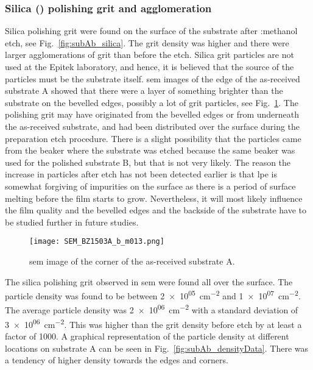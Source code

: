 \subsubsection{Silica () polishing grit and agglomeration}

Silica polishing grit were found on the surface of the substrate after :methanol etch, see Fig.~\ref{fig:subAb_silica}. The grit density was higher and there were larger agglomerations of grit than before the etch. Silica grit particles are not used at the Epitek laboratory, and hence, it is believed that the source of the particles must be the substrate itself. \Ac{sem} images of the edge of the as-received substrate A showed that there were a layer of something brighter than the substrate on the bevelled edges, possibly a lot of grit particles, see Fig.~\ref{fig:subAa_corner_w_grit}. The polishing grit may have originated from the bevelled edges or from underneath the as-received substrate, and had been distributed over the surface during the preparation etch procedure. There is a slight possibility that the particles came from the beaker where the substrate was etched because the same beaker was used for the polished substrate B, but that is not very likely. The reason the increase in particles after etch has not been detected earlier is that \ac{lpe} is somewhat forgiving of impurities on the surface as there is a period of surface melting before the film starts to grow. Nevertheless, it will most likely influence the film quality and the bevelled edges and the backside of the substrate have to be studied further in future studies.

\begin{figure}[htbp]
    \centering
    \texttt{[image: SEM\_BZ1503A\_b\_m013.png]}
    \caption{\Ac{sem} image of the corner of the as-received substrate A.}
    \label{fig:subAa_corner_w_grit}
\end{figure}

The silica polishing grit observed in \ac{sem} were found all over the surface. The particle density was found to be between \SI{2e+05}{\centi\metre^{-2}} and \SI{1e+07}{\centi\metre^{-2}}. The average particle density was \SI{2e+06}{\centi\metre^{-2}} with a standard deviation of \SI{3e+06}{\centi\metre^{-2}}. This was higher than the grit density before etch by at least a factor of 1000. A graphical representation of the particle density at different locations on substrate A can be seen in Fig.~\ref{fig:subAb_densityData}. There was a tendency of higher density towards the edges and corners.

